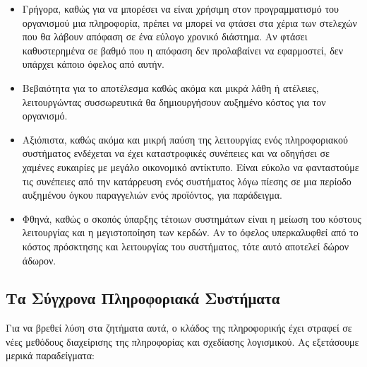 \documentclass{article}
\begin{document}
\begin{itemize}
\item Γρήγορα, καθώς για να μπορέσει να είναι χρήσιμη στον προγραμματισμό του οργανισμού μια πληροφορία, πρέπει να μπορεί να φτάσει στα χέρια των στελεχών που θα λάβουν απόφαση σε ένα εύλογο χρονικό διάστημα. Αν φτάσει καθυστερημένα σε βαθμό που η απόφαση δεν προλαβαίνει να εφαρμοστεί, δεν υπάρχει κάποιο όφελος από αυτήν.
\item Βεβαιότητα για το αποτέλεσμα καθώς ακόμα και μικρά λάθη ή ατέλειες, λειτουργώντας συσσωρευτικά θα δημιουργήσουν αυξημένο κόστος για τον οργανισμό.
\item Αξιόπιστα, καθώς ακόμα και μικρή παύση της λειτουργίας ενός πληροφοριακού συστήματος ενδέχεται να έχει καταστροφικές συνέπειες και να οδηγήσει σε χαμένες ευκαιρίες με μεγάλο οικονομικό αντίκτυπο. Είναι εύκολο να φανταστούμε τις συνέπειες από την κατάρρευση ενός συστήματος λόγω πίεσης σε μια περίοδο αυξημένου όγκου παραγγελιών ενός προϊόντος, για παράδειγμα.
\item Φθηνά, καθώς ο σκοπός ύπαρξης τέτοιων συστημάτων είναι η μείωση του κόστους λειτουργίας και η μεγιστοποίηση των κερδών. Αν το όφελος υπερκαλυφθεί από το κόστος πρόσκτησης και λειτουργίας του συστήματος, τότε αυτό αποτελεί δώρον άδωρον.
\end{itemize}

\subsection{Τα Σύγχρονα Πληροφοριακά Συστήματα}
Για να βρεθεί λύση στα ζητήματα αυτά, ο κλάδος της πληροφορικής έχει στραφεί σε νέες  μεθόδους διαχείρισης της πληροφορίας και σχεδίασης λογισμικού. Ας εξετάσουμε μερικά παραδείγματα:
\end{document}
